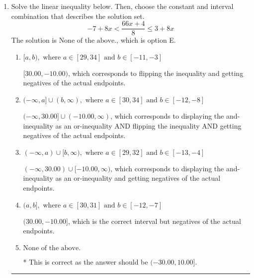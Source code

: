 \documentclass{extbook}[14pt]
\newcommand{\litem}[1]{\item #1

\rule{\textwidth}{0.4pt}}
\begin{document}
\begin{enumerate}
{\begin{enumerate}[label=\Alph*.]
This describes the values more than 9 from 5
\item \( [-4, 14] \)

This describes the values no more than 9 from 5
\item \( (-4, 14) \)

This describes the values less than 9 from 5
\item \( (-\infty, -4] \cup [14, \infty) \)

This describes the values no less than 9 from 5
\item \( \text{None of the above} \)

You likely thought the values in the interval were not correct.
\end{enumerate}

\textbf{General Comment:} When thinking about this language, it helps to draw a number line and try points.
}
\litem{
Solve the linear inequality below. Then, choose the constant and interval combination that describes the solution set.
\[ -7 + 8 x < \frac{66 x + 4}{8} \leq 3 + 8 x \]The solution is \( \text{None of the above.} \), which is option E.\begin{enumerate}[label=\Alph*.]
\item \( [a, b), \text{ where } a \in [29, 34] \text{ and } b \in [-11, -3] \)

$[30.00, -10.00)$, which corresponds to flipping the inequality and getting negatives of the actual endpoints.
\item \( (-\infty, a] \cup (b, \infty), \text{ where } a \in [30, 34] \text{ and } b \in [-12, -8] \)

$(-\infty, 30.00] \cup (-10.00, \infty)$, which corresponds to displaying the and-inequality as an or-inequality AND flipping the inequality AND getting negatives of the actual endpoints.
\item \( (-\infty, a) \cup [b, \infty), \text{ where } a \in [29, 32] \text{ and } b \in [-13, -4] \)

$(-\infty, 30.00) \cup [-10.00, \infty)$, which corresponds to displaying the and-inequality as an or-inequality and getting negatives of the actual endpoints.
\item \( (a, b], \text{ where } a \in [30, 31] \text{ and } b \in [-12, -7] \)

$(30.00, -10.00]$, which is the correct interval but negatives of the actual endpoints.
\item \( \text{None of the above.} \)

* This is correct as the answer should be $(-30.00, 10.00]$.
\end{enumerate}

}
\end{enumerate}
\end{document}
